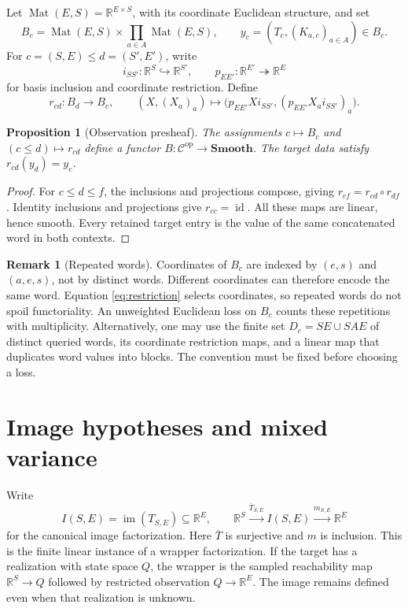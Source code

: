 \documentclass[11pt]{article}
\newtheorem{proposition}[theorem]{Proposition}
\theoremstyle{definition}
\newtheorem{remark}[theorem]{Remark}
\newcommand{\R}{\mathbb R}
\newcommand{\im}{\operatorname{im}}
\newcommand{\Mat}{\operatorname{Mat}}
\newcommand{\Smooth}{\mathbf{Smooth}}
\newcommand{\id}{\operatorname{id}}
\begin{document}
Let $\Mat(E,S)=\R^{E\times S}$, with its coordinate Euclidean structure, and set
\[
B_c=\Mat(E,S)\times\prod_{a\in A}\Mat(E,S),
\qquad y_c=(T_c,(K_{a,c})_{a\in A})\in B_c.
\]
For $c=(S,E)\leq d=(S',E')$, write
\[
i_{SS'}:\R^S\hookrightarrow\R^{S'},\qquad
p_{EE'}:\R^{E'}\twoheadrightarrow\R^E
\]
for basis inclusion and coordinate restriction. Define
\begin{equation}\label{eq:restriction}
r_{cd}:B_d\longrightarrow B_c,
\qquad
(X,(X_a)_a)\longmapsto
\bigl(p_{EE'}Xi_{SS'},(p_{EE'}X_ai_{SS'})_a\bigr).
\end{equation}

\begin{proposition}[Observation presheaf]\label{prop:presheaf}
The assignments $c\mapsto B_c$ and $(c\leq d)\mapsto r_{cd}$ define a functor
$B:\mathcal C^{\mathrm{op}}\to\Smooth$. The target data satisfy
$r_{cd}(y_d)=y_c$.
\end{proposition}
\begin{proof}
For $c\leq d\leq f$, the inclusions and projections compose, giving
$r_{cf}=r_{cd}\circ r_{df}$. Identity inclusions and projections give
$r_{cc}=\id$. All these maps are linear, hence smooth. Every retained target
entry is the value of the same concatenated word in both contexts.
\end{proof}

\begin{remark}[Repeated words]
Coordinates of $B_c$ are indexed by $(e,s)$ and $(a,e,s)$, not by distinct words.
Different coordinates can therefore encode the same word. Equation
\eqref{eq:restriction} selects coordinates, so repeated words do not spoil
functoriality. An unweighted Euclidean loss on $B_c$ counts these repetitions
with multiplicity. Alternatively, one may use the finite set
$D_c=SE\cup SAE$ of distinct queried words, its coordinate restriction maps,
and a linear map that duplicates word values into blocks. The convention must
be fixed before choosing a loss.
\end{remark}

\section{Image hypotheses and mixed variance}

Write
\[
I(S,E)=\im(T_{S,E})\subseteq\R^E,
\qquad
\R^S\xrightarrow{\overline T_{S,E}}I(S,E)
\xrightarrow{m_{S,E}}\R^E
\]
for the canonical image factorization. Here $\overline T$ is surjective and
$m$ is inclusion. This is the finite linear instance of a wrapper
factorization. If the target has a realization with state space $Q$, the
wrapper is the sampled reachability map $\R^S\to Q$ followed by restricted
observation $Q\to\R^E$. The image remains defined even when that realization
is unknown.
\end{document}
